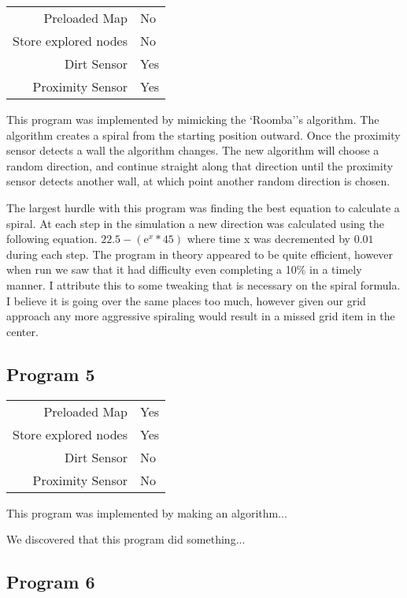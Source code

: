 \documentclass[letterpaper]{article}
\begin{document}
\begin{tabular}{ r | l }  
	Preloaded Map			& No \\
	Store explored nodes	& No \\
	Dirt Sensor				& Yes \\
	Proximity Sensor		& Yes \\
\end{tabular}

This program was implemented by mimicking the `Roomba''s algorithm.  The algorithm creates a spiral from the starting position outward.  Once the proximity sensor detects a wall the algorithm changes.  The new algorithm will choose a random direction, and continue straight along that direction until the proximity sensor detects another wall, at which point another random direction is chosen.  

The largest hurdle with this program was finding the best equation to calculate a spiral.  At each step in the simulation a new direction was calculated using the following equation.
$ 22.5 - (\mathrm {e} ^ x * 45)$
where time x was decremented by $0.01$ during each step.  The program in theory appeared to be quite efficient, however when run we saw that it had difficulty even completing a 10\% in a timely manner.  I attribute this to some tweaking that is necessary on the spiral formula.  I believe it is going over the same places too much, however given our grid approach any more aggressive spiraling would result in a missed grid item in the center.


\subsection{Program 5}

\begin{tabular}{ r | l }  
	Preloaded Map			& Yes \\
	Store explored nodes	& Yes \\
	Dirt Sensor				& No \\
	Proximity Sensor		& No \\
\end{tabular}

This program was implemented by making an algorithm...

We discovered that this program did something...


\subsection{Program 6}
\end{document}
